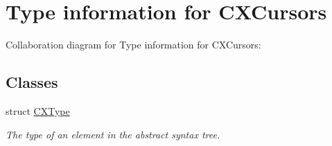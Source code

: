 \hypertarget{group__CINDEX__TYPES}{}\section{Type information for C\+X\+Cursors}
\label{group__CINDEX__TYPES}
Collaboration diagram for Type information for C\+X\+Cursors\+:
\subsection*{Classes}
\begin{DoxyCompactItemize}
\item 
struct \hyperlink{structCXType}{C\+X\+Type}
\begin{DoxyCompactList}\small\item\em The type of an element in the abstract syntax tree. \end{DoxyCompactList}\end{DoxyCompactItemize}
